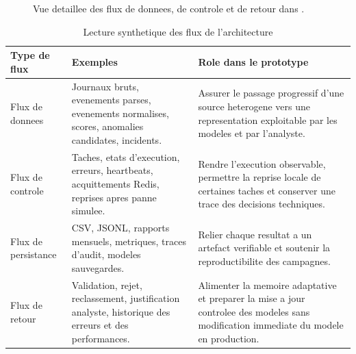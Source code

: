 \begin{figure}[H]
{
}
\caption{Vue detaillee des flux de donnees, de controle et de retour dans \logminer{}.}
\label{fig:architecture-detaillee}
\end{figure}

\begin{table}[H]
\centering
\caption{Lecture synthetique des flux de l'architecture}
\label{tab:flux-architecture}
\scriptsize
\begin{tabularx}{\textwidth}{p{3.0cm}p{4.0cm}X}
\toprule
\textbf{Type de flux} & \textbf{Exemples} & \textbf{Role dans le prototype} \tabularnewline
\midrule
Flux de donnees &
Journaux bruts, evenements parses, evenements normalises, scores, anomalies candidates, incidents. &
Assurer le passage progressif d'une source heterogene vers une representation exploitable par les modeles et par l'analyste. \tabularnewline
Flux de controle &
Taches, etats d'execution, erreurs, heartbeats, acquittements Redis, reprises apres panne simulee. &
Rendre l'execution observable, permettre la reprise locale de certaines taches et conserver une trace des decisions techniques. \tabularnewline
Flux de persistance &
CSV, JSONL, rapports mensuels, metriques, traces d'audit, modeles sauvegardes. &
Relier chaque resultat a un artefact verifiable et soutenir la reproductibilite des campagnes. \tabularnewline
Flux de retour &
Validation, rejet, reclassement, justification analyste, historique des erreurs et des performances. &
Alimenter la memoire adaptative et preparer la mise a jour controlee des modeles sans modification immediate du modele en production. \tabularnewline
\bottomrule
\end{tabularx}
\end{table}


